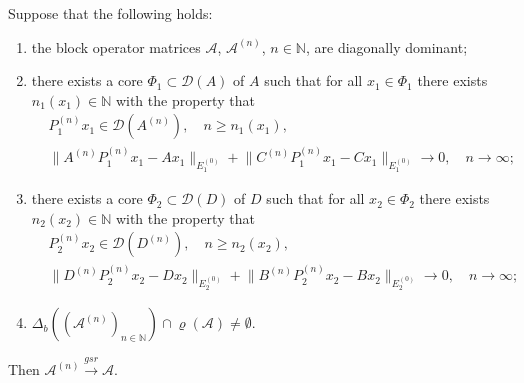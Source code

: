 \documentclass[a4paper,reqno]{amsart}
\begin{document}
\begin{theorem}
Suppose that the following holds:
\begin{enumerate}[label=\rm{\roman{*})}]
\item the block operator matrices ${\mathcal A}$, ${\mathcal A}^{(n)}$, $n\in{\mathbb{N}}$, are diagonally dominant;
\item there exists a core $\Phi_1\subset{\mathcal D}(A)$ of $A$ such that for all $x_1\in\Phi_1$ there exists $n_1(x_1)\in{\mathbb{N}}$ with the property that
\begin{align*}
&P_1^{(n)}x_1\in{\mathcal D}(A^{(n)}), \quad n\geq n_1(x_1), \\
&\big\|A^{(n)}P_1^{(n)}x_1- Ax_1\big\|_{E_1^{(0)}}+\big\|C^{(n)}P_1^{(n)}x_1- Cx_1\big\|_{E_1^{(0)}}{\longrightarrow} 0, \quad n\to\infty;
\end{align*}
\item there exists a core $\Phi_2\subset{\mathcal D}(D)$ of $D$ such that for all $x_2\in\Phi_2$ there exists $n_2(x_2)\in{\mathbb{N}}$ with the property that
\begin{align*}
&P_2^{(n)}x_2\in{\mathcal D}(D^{(n)}), \quad n\geq n_2(x_2), \\
&\big\|D^{(n)}P_2^{(n)}x_2- Dx_2\big\|_{E_2^{(0)}}+\big\|B^{(n)}P_2^{(n)}x_2- Bx_2\big\|_{E_2^{(0)}}{\longrightarrow} 0, \quad n\to\infty;
\end{align*}
\item  $\Delta_b\left(({\mathcal A}^{(n)})_{n\in{\mathbb{N}}}\right)\cap\varrho({\mathcal A})\neq\emptyset$.
 \end{enumerate}
Then ${\mathcal A}^{(n)}{\stackrel{gsr}{\rightarrow}}{\mathcal A}$.
\label{propgsrformatrix}
\end{theorem}
\end{document}
